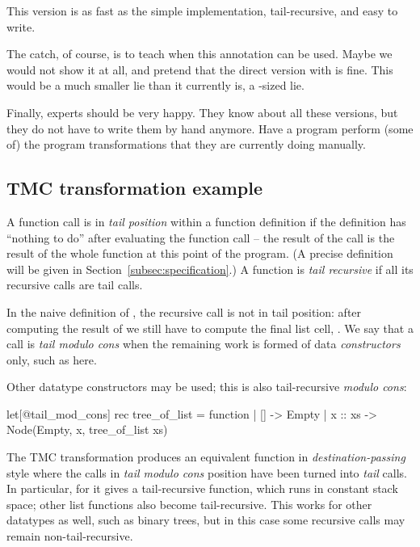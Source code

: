 This version is as fast as the simple implementation, tail-recursive,
and easy to write.

The catch, of course, is to teach when this 
annotation can be used. Maybe we would not show it at all, and pretend
that the direct  version with  is fine. This
would be a much smaller lie than it currently is,
a -sized lie.

Finally, experts should be very happy. They know about all these
versions, but they do not have to write them by hand anymore. Have
a program perform (some of) the program transformations that they are
currently doing manually.

\subsection{TMC transformation example}
\label{subsec:tmc_example}

A function call is in \emph{tail position} within a function
definition if the definition has ``nothing to do'' after evaluating
the function call -- the result of the call is the result of the whole
function at this point of the program. (A precise definition will be
given in Section~\ref{subsec:specification}.) A function is \emph{tail recursive}
if all its recursive calls are tail calls.

In the naive definition of , the recursive call is not in tail
position: after computing the result of  we still have
to compute the final list cell, . We say that a call is
\emph{tail modulo cons} when the remaining work is formed of data
\emph{constructors} only, such as \ocaml{(::)} here.

Other datatype constructors may be used; this is
also tail-recursive \emph{modulo cons}:

\begin{Ocaml}
let[@tail_mod_cons] rec tree_of_list = function
| [] -> Empty
| x :: xs -> Node(Empty, x, tree_of_list xs)
\end{Ocaml}

The TMC transformation produces an equivalent function in
\emph{destination-passing} style where the calls in \emph{tail modulo
  cons} position have been turned into \emph{tail} calls. In
particular, for  it gives a tail-recursive function, which
runs in constant stack space; other list functions also become
tail-recursive. This works for other datatypes as well, such as binary trees,
but in this case some recursive calls may remain non-tail-recursive.

